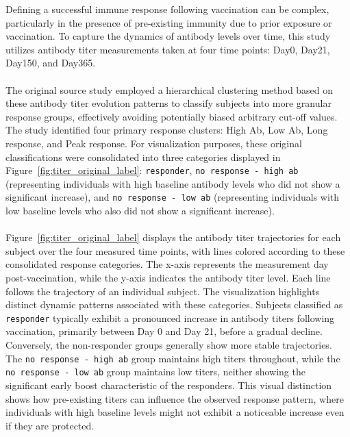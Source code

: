 \documentclass[12pt,a4paper]{report}
\begin{document}
\noindent
Defining a successful immune response following vaccination can be complex, particularly in the presence of pre-existing immunity due to prior exposure or vaccination. To capture the dynamics of antibody levels over time, this study utilizes antibody titer measurements taken at four time points: Day0, Day21, Day150, and Day365.\\
\\
The original source study \cite{bartholomeus2020transcriptomic} employed a hierarchical clustering method based on these antibody titer evolution patterns to classify subjects into more granular response groups, effectively avoiding potentially biased arbitrary cut-off values. The study identified four primary response clusters: High Ab, Low Ab, Long response, and Peak response. For visualization purposes, these original classifications were consolidated into three categories displayed in Figure~\ref{fig:titer_original_label}: \texttt{responder}, \texttt{no response - high ab} (representing individuals with high baseline antibody levels who did not show a significant increase), and \texttt{no response - low ab} (representing individuals with low baseline levels who also did not show a significant increase).\\
\\
Figure~\ref{fig:titer_original_label} displays the antibody titer trajectories for each subject over the four measured time points, with lines colored according to these consolidated response categories. The x-axis represents the measurement day post-vaccination, while the y-axis indicates the antibody titer level. Each line follows the trajectory of an individual subject. The visualization highlights distinct dynamic patterns associated with these categories. Subjects classified as \texttt{responder} typically exhibit a pronounced increase in antibody titers following vaccination, primarily between Day 0 and Day 21, before a gradual decline. Conversely, the non-responder groups generally show more stable trajectories. The \texttt{no response - high ab} group maintains high titers throughout, while the \texttt{no response - low ab} group maintains low titers, neither showing the significant early boost characteristic of the responders. This visual distinction shows how pre-existing titers can influence the observed response pattern, where individuals with high baseline levels might not exhibit a noticeable increase even if they are protected.\\
\\
\end{document}
